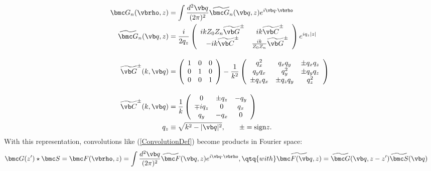 \documentclass[letterpaper]{article}
\renewcommand{\wt}{\widetilde}
\begin{document}
\begin{subequations}
\begin{align}
  \bmc G_n(\vbrho, z)
 &=
  \int \frac{d^2 \vb q}{(2\pi)^2}
  \wt{\bmc G_n}(\vb q, z) e^{i\vb q \cdot \vbrho}
\\
   \wt{\bmc G}_n(\vb q, z)
&= \frac{i}{2q_z}
   \left(\begin{array}{cc}
   ikZ_0 Z_n \wt{\vb G}^\pm & ik\wt{\vb C}^\pm \\
  -ik\wt{ \vb C}^\pm & \frac{ik}{Z_0 Z_n}\wt{\vb G}^\pm
   \end{array}\right)e^{iq_z |z|}
\\[10pt]
   \wt{\vb G}^\pm(k, \vb q) 
&= \left(\begin{array}{ccc}
   1 & 0 & 0 \\ 0 & 1 & 0 \\ 0 & 0 & 1
   \end{array}\right)
   -
   \frac{1}{k^2}
   \left(\begin{array}{ccc}
    q_x^2    & q_xq_y       & \pm q_x q_z \\
    q_y q_x  & q_y^2        & \pm q_y q_z \\
 \pm q_z q_x  & \pm q_z q_y  & q_z^2 
   \end{array}\right)
\\[10pt]
   \wt{\vb C}^\pm(k, \vb q) 
&=
   \frac{1}{k} 
   \left(\begin{array}{ccc}
   0           & \pm q_z &    -q_y \\
   \mp iq_z    & 0       &     q_x \\
        q_y    & -q_x    &      0
  \end{array}\right)
\\
  q_z &\equiv \sqrt{k^2 - |\vb q|^2},
 \qquad \pm = \text{sign} z.
\end{align}
\label{GFourier}
\end{subequations}
\noindent With this representation, convolutions like (\ref{ConvolutionDef})
become products in Fourier space:
\begin{align*}
\bmc G(z^\prime)\star \bmc S=
 \bmc F(\vbrho, z)
&=\int \frac{d^2 \vb q}{(2 \pi)^2} \wt{\bmc F}(\vb q,z) e^{i\vb q \cdot \vbrho},
\qtq{with}
 \wt{\bmc F(\vb q,z)}=\wt{\bmc G}(\vb q,z-z^\prime)\wt{\bmc S}(\vb q)
\end{align*}
\end{document}
